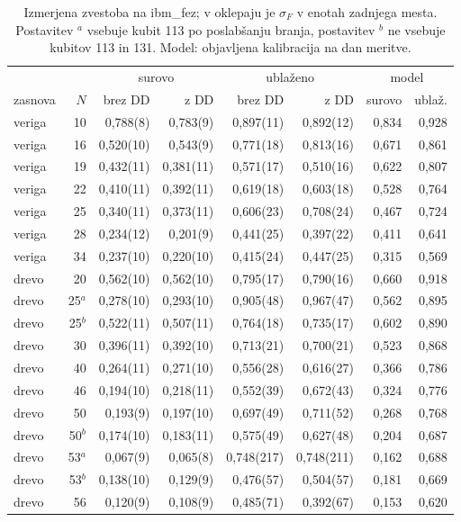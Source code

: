 \begin{table}[htbp]
\caption{Izmerjena zvestoba na ibm\_fez; v oklepaju je $\sigma_F$ v enotah zadnjega mesta. Postavitev $^a$ vsebuje kubit 113 po poslabšanju branja, postavitev $^b$ ne vsebuje kubitov 113 in 131. Model: objavljena kalibracija na dan meritve.}
\label{g20:tab:zvestobe}
\centering
\small
\begin{tabular}{lrrrrrrr}
\toprule
& & \multicolumn{2}{c}{surovo} & \multicolumn{2}{c}{ublaženo} & \multicolumn{2}{c}{model} \\
zasnova & $N$ & brez DD & z DD & brez DD & z DD & surovo & ublaž. \\
\midrule
veriga & 10 & 0,788(8) & 0,783(9) & 0,897(11) & 0,892(12) & 0,834 & 0,928 \\
veriga & 16 & 0,520(10) & 0,543(9) & 0,771(18) & 0,813(16) & 0,671 & 0,861 \\
veriga & 19 & 0,432(11) & 0,381(11) & 0,571(17) & 0,510(16) & 0,622 & 0,807 \\
veriga & 22 & 0,410(11) & 0,392(11) & 0,619(18) & 0,603(18) & 0,528 & 0,764 \\
veriga & 25 & 0,340(11) & 0,373(11) & 0,606(23) & 0,708(24) & 0,467 & 0,724 \\
veriga & 28 & 0,234(12) & 0,201(9) & 0,441(25) & 0,397(22) & 0,411 & 0,641 \\
veriga & 34 & 0,237(10) & 0,220(10) & 0,415(24) & 0,447(25) & 0,315 & 0,569 \\
\midrule
drevo & 20 & 0,562(10) & 0,562(10) & 0,795(17) & 0,790(16) & 0,660 & 0,918 \\
drevo & 25$^{a}$ & 0,278(10) & 0,293(10) & 0,905(48) & 0,967(47) & 0,562 & 0,895 \\
drevo & 25$^{b}$ & 0,522(11) & 0,507(11) & 0,764(18) & 0,735(17) & 0,602 & 0,890 \\
drevo & 30 & 0,396(11) & 0,392(10) & 0,713(21) & 0,700(21) & 0,523 & 0,868 \\
drevo & 40 & 0,264(11) & 0,271(10) & 0,556(28) & 0,616(27) & 0,366 & 0,786 \\
drevo & 46 & 0,194(10) & 0,218(11) & 0,552(39) & 0,672(43) & 0,324 & 0,776 \\
drevo & 50 & 0,193(9) & 0,197(10) & 0,697(49) & 0,711(52) & 0,268 & 0,768 \\
drevo & 50$^{b}$ & 0,174(10) & 0,183(11) & 0,575(49) & 0,627(48) & 0,204 & 0,687 \\
drevo & 53$^{a}$ & 0,067(9) & 0,065(8) & 0,748(217) & 0,748(211) & 0,162 & 0,688 \\
drevo & 53$^{b}$ & 0,138(10) & 0,129(9) & 0,476(57) & 0,504(57) & 0,181 & 0,669 \\
drevo & 56 & 0,120(9) & 0,108(9) & 0,485(71) & 0,392(67) & 0,153 & 0,620 \\
\bottomrule
\end{tabular}
\end{table}

